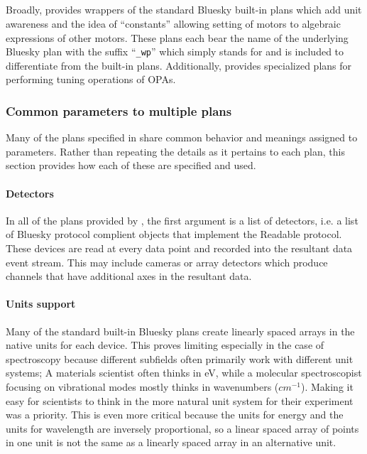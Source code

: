\subsection{\wrightplans}


Broadly, \wrightplans provides wrappers of the standard Bluesky built-in plans which add unit awareness and the idea of ``constants'' allowing setting of motors to algebraic expressions of other motors.
These plans each bear the name of the underlying Bluesky plan with the suffix ``\texttt{\_wp}'' which simply stands for \wrightplans and is included to differentiate from the built-in plans.
Additionally, \wrightplans provides specialized plans for performing tuning operations of OPAs.

\subsubsection{Common parameters to multiple plans}
\label{common_params}

Many of the plans specified in \wrightplans share common behavior and meanings assigned to parameters.
Rather than repeating the details as it pertains to each plan, this section provides how each of these are specified and used.

\paragraph{Detectors}

In all of the plans provided by \wrightplans, the first argument is a list of detectors, i.e. a list of Bluesky protocol complient objects that implement the Readable protocol.
These devices are read at every data point and recorded into the resultant data event stream.
This may include cameras or array detectors which produce channels that have additional axes in the resultant data.

\paragraph{Units support}

Many of the standard built-in Bluesky plans create linearly spaced arrays in the native units for each device.
This proves limiting especially in the case of spectroscopy because different subfields often primarily work with different unit systems; A materials scientist often thinks in eV, while a molecular spectroscopist focusing on vibrational modes mostly thinks in wavenumbers ($cm^{-1}$).
Making it easy for scientists to think in the more natural unit system for their experiment was a priority.
This is even more critical because the units for energy and the units for wavelength are inversely proportional, so a linear spaced array of points in one unit is not the same as a linearly spaced array in an alternative unit.


